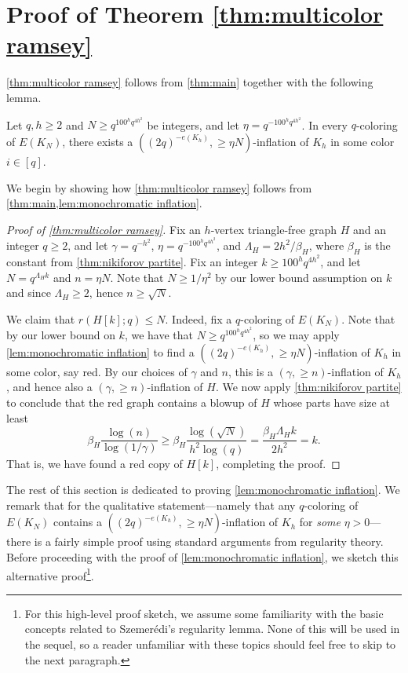 \section{Proof of Theorem \ref{thm:multicolor ramsey}}\label{sec:ramsey}

\cref{thm:multicolor ramsey} follows from \cref{thm:main} together with the following lemma.
\begin{lemma}\label{lem:monochromatic inflation}
    Let $q,h \geq 2$ and $N\geq q^{100^h q^{4h^2}}$ be integers, and let $\eta=q^{-100^h q^{4h^2}}$. In every $q$-coloring of $E(K_N)$, there exists a $((2q)^{-e(K_h)}, \geq \eta N)$-inflation of $K_h$ in some color $i \in [q]$.
\end{lemma}

We begin by showing how \cref{thm:multicolor ramsey} follows from \cref{thm:main,lem:monochromatic inflation}.
\begin{proof}[Proof of \cref{thm:multicolor ramsey}]
Fix an $h$-vertex triangle-free graph $H$ and an integer $q \geq 2$, and let $\gamma = q^{-h^2}$, $\eta = q^{-100^h q^{4h^2}}$, and $\Lambda_H=2h^2/\beta_H$, where $\beta_H$ is the constant from \cref{thm:nikiforov partite}. 
Fix an integer $k \geq 100^h q^{4h^2}$, and let $N = q^{\Lambda_H k}$ and $n = \eta N$. Note that $N \geq 1/\eta^2$ by our lower bound assumption on $k$ and since $\Lambda_H \geq 2$, hence $n \geq \sqrt N$.

We claim that $r(H[k];q) \leq N$. Indeed,
fix a $q$-coloring of $E(K_N)$. Note that by our lower bound on $k$, we have that $N \geq q^{100^h q^{4h^2}}$, so we may apply \cref{lem:monochromatic inflation} to find a $((2q)^{-e(K_h)}, \geq \eta N)$-inflation of $K_h$ in some color, say red. By our choices of $\gamma$ and $n$, this is a $(\gamma, \geq n)$-inflation of $K_h$, and hence also a $(\gamma, \geq n)$-inflation of $H$. We now apply \cref{thm:nikiforov partite} to conclude that the red graph contains a blowup of $H$ whose parts have size at least
\[
\beta_H \frac{\log(n)}{\log(1/\gamma)} \geq \beta_H\frac{\log(\sqrt N)}{h^2 \log(q)} =\frac{\beta_H \Lambda_H k}{2h^2} = k.
\]
That is, we have found a red copy of $H[k]$, completing the proof.
\end{proof}


The rest of this section is dedicated to proving \cref{lem:monochromatic inflation}. We remark that for the qualitative statement---namely that any $q$-coloring of $E(K_N)$ contains a $((2q)^{-e(K_h)}, \geq\eta N)$-inflation of $K_h$ for \emph{some} $\eta>0$---there is a fairly simple proof using standard arguments from regularity theory. Before proceeding with the proof of \cref{lem:monochromatic inflation}, we sketch this alternative proof\footnote{For this high-level proof sketch, we assume some familiarity with the basic concepts related to Szemer\'edi's regularity lemma. None of this will be used in the sequel, so a reader unfamiliar with these topics should feel free to skip to the next paragraph.}.


